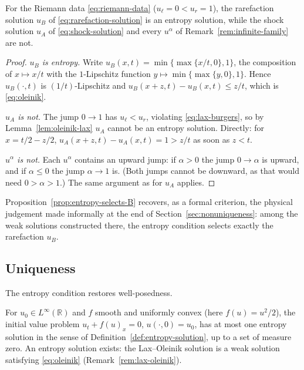 \begin{proposition}
\label{prop:entropy-selects-B}
For the Riemann data \eqref{eq:riemann-data} ($u_\ell=0<u_r=1$), the
rarefaction solution $u_B$ of \eqref{eq:rarefaction-solution} is an
entropy solution, while the shock solution $u_A$ of
\eqref{eq:shock-solution} and every $u^\alpha$ of
Remark~\ref{rem:infinite-family} are not.
\end{proposition}

\begin{proof}
\emph{$u_B$ is entropy.} Write $u_B(x,t)=\min\{\max\{x/t,0\},1\}$, the
composition of $x\mapsto x/t$ with the $1$-Lipschitz function
$y\mapsto\min\{\max\{y,0\},1\}$. Hence $u_B(\cdot,t)$ is $(1/t)$-Lipschitz
and $u_B(x+z,t)-u_B(x,t)\le z/t$, which is \eqref{eq:oleinik}.

\emph{$u_A$ is not.} The jump $0\to1$ has $u_\ell<u_r$, violating
\eqref{eq:lax-burgers}, so by Lemma~\ref{lem:oleinik-lax} $u_A$ cannot be
an entropy solution. Directly: for $x=t/2-z/2$, $u_A(x+z,t)-u_A(x,t)=1>z/t$
as soon as $z<t$.

\emph{$u^\alpha$ is not.} Each $u^\alpha$ contains an upward jump: if
$\alpha>0$ the jump $0\to\alpha$ is upward, and if $\alpha\le0$ the jump
$\alpha\to1$ is. (Both jumps cannot be downward, as that would need
$0>\alpha>1$.) The same argument as for $u_A$ applies.
\end{proof}

Proposition~\ref{prop:entropy-selects-B} recovers, as a formal criterion,
the physical judgement made informally at the end of
Section~\ref{sec:nonuniqueness}: among the weak solutions constructed
there, the entropy condition selects exactly the rarefaction $u_B$.

\subsection{Uniqueness}
\label{subsec:entropy-uniqueness}

The entropy condition restores well-posedness.

\begin{theorem}
\label{thm:oleinik-uniqueness}
For $u_0 \in L^\infty(\mathbb{R})$ and $f$ smooth and uniformly convex
(here $f(u)=u^2/2$), the initial value problem
$u_t+f(u)_x=0$, $u(\cdot,0)=u_0$, has at most one entropy solution in
the sense of Definition~\ref{def:entropy-solution}, up to a set of measure
zero. An entropy solution exists: the Lax--Oleinik solution
\cite[\S3.4.2]{evans2010} is a weak solution satisfying
\eqref{eq:oleinik} (Remark~\ref{rem:lax-oleinik}).
\end{theorem}

